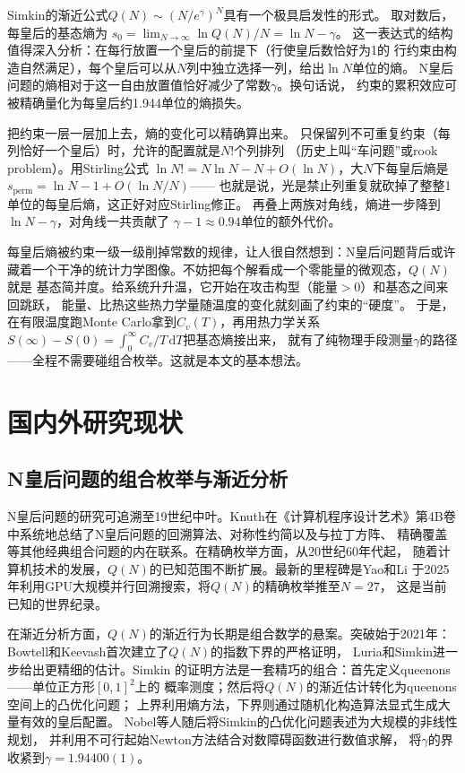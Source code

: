 Simkin的渐近公式$Q(N)\sim(N/e^{\gamma})^{N}$具有一个极具启发性的形式。
取对数后，每皇后的基态熵为
$s_{0}=\lim_{N\to\infty}\ln Q(N)/N=\ln N-\gamma$。
这一表达式的结构值得深入分析：在每行放置一个皇后的前提下（行使皇后数恰好为1的
行约束由构造自然满足），每个皇后可以从$N$列中独立选择一列，给出$\ln N$单位的熵。
N皇后问题的熵相对于这一自由放置值恰好减少了常数$\gamma$。换句话说，
约束的累积效应可被精确量化为每皇后约1.944单位的熵损失。

把约束一层一层加上去，熵的变化可以精确算出来\cite{Knuth2022}。
只保留列不可重复约束（每列恰好一个皇后）时，允许的配置就是$N!$个列排列
（历史上叫``车问题''或rook problem）。用Stirling公式
$\ln N!=N\ln N-N+O(\ln N)$，大$N$下每皇后熵是
$s_{\text{perm}}=\ln N-1+O(\ln N/N)$——
也就是说，光是禁止列重复就砍掉了整整1单位的每皇后熵，这正好对应Stirling修正。
再叠上两族对角线，熵进一步降到$\ln N-\gamma$，对角线一共贡献了
$\gamma-1\approx0.94$单位的额外代价。

每皇后熵被约束一级一级削掉常数的规律，让人很自然想到：N皇后问题背后或许
藏着一个干净的统计力学图像。不妨把每个解看成一个零能量的微观态，$Q(N)$就是
基态简并度。给系统升升温，它开始在攻击构型（能量$>0$）和基态之间来回跳跃，
能量、比热这些热力学量随温度的变化就刻画了约束的``硬度''。
于是，在有限温度跑Monte Carlo拿到$C_v(T)$，再用热力学关系
$S(\infty)-S(0)=\int_{0}^{\infty}C_{v}/T\,\mathrm{d}T$把基态熵接出来，
就有了纯物理手段测量$\gamma$的路径——全程不需要碰组合枚举。这就是本文的基本想法。

\section{国内外研究现状}

\subsection{N皇后问题的组合枚举与渐近分析}

N皇后问题的研究可追溯至19世纪中叶。Knuth在《计算机程序设计艺术》第4B卷
\cite{Knuth2022}中系统地总结了N皇后问题的回溯算法、对称性约简以及与拉丁方阵、
精确覆盖等其他经典组合问题的内在联系。在精确枚举方面，从20世纪60年代起，
随着计算机技术的发展，$Q(N)$的已知范围不断扩展。最新的里程碑是Yao和Li
\cite{Yao2025}于2025年利用GPU大规模并行回溯搜索，将$Q(N)$的精确枚举推至$N=27$，
这是当前已知的世界纪录。

在渐近分析方面，$Q(N)$的渐近行为长期是组合数学的悬案。突破始于2021年：
Bowtell和Keevash\cite{Bowtell2023}首次建立了$Q(N)$的指数下界的严格证明，
Luria和Simkin\cite{Luria2021}进一步给出更精细的估计。Simkin\cite{Simkin2022}
的证明方法是一套精巧的组合：首先定义queenons——单位正方形$[0,1]^{2}$上的
概率测度；然后将$Q(N)$的渐近估计转化为queenons空间上的凸优化问题；
上界利用熵方法，下界则通过随机化构造算法显式生成大量有效的皇后配置。
Nobel等人\cite{Nobel2023}随后将Simkin的凸优化问题表述为大规模的非线性规划，
并利用不可行起始Newton方法结合对数障碍函数进行数值求解，
将$\gamma$的界收紧到$\gamma=1.94400(1)$。

